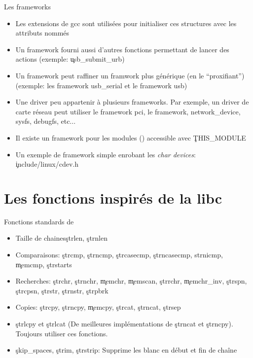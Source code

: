 \begin{frame}[fragile=singleslide]{Les frameworks}
  \begin{itemize} 
  \item  Les extensions  de gcc  sont utilisées  pour  initialiser ces
    structures avec les attributs nommés
  \item  Un framework  fourni aussi  d'autres fonctions  permettant de
    lancer des actions (exemple: \c{usb_submit_urb})
  \item Un  framework peut raffiner  un framwork plus générique  (en le
    ``proxifiant'')   (exemple:  les   framework  usb\_serial   et  le
    framework usb)
  \item Une driver peu appartenir à plusieurs frameworks. Par exemple,
    un  driver de  carte réseau  peut  utiliser le  framework pci,  le
    framework, network\_device, sysfs, debugfs, etc...
  \item    Il     existe    un    framework     pour    les    modules
    () accessible avec \c{THIS_MODULE}
  \item  Un  exemple  de   framework  simple  enrobant  les  \emph{char
      devices}: \c{include/linux/cdev.h}
  \end{itemize}
\end{frame} 

\section{Les fonctions inspirés de la libc}

\begin{frame}{Fonctions standards de }
  \begin{itemize} 
  \item Taille de chaines\c{strlen}, \c{strnlen}
  \item   Comparaisons:   \c{strcmp},   \c{strncmp},   \c{strcasecmp},
    \c{strncasecmp}, \c{ strnicmp}, \c{memcmp}, \c{strstarts}
  \item Recherches:  \c{strchr}, \c{strnchr}, \c{memchr}, \c{memscan},
    \c{strrchr},  \c{memchr_inv}, \c{strspn},  \c{strcpsn}, \c{strstr},
    \c{strnstr}, \c{strpbrk}
  \item  Copies:   \c{strcpy},  \c{strncpy},  \c{memcpy},  \c{strcat},
    \c{strncat}, \c{strsep}
  \item \c{strlcpy}  et \c{strlcat} (De  meilleures implémentations de
    \c{strncat} et \c{strncpy}). Toujours utiliser ces fonctions.
  \item \c{skip_spaces},  \c{strim}, \c{strstrip}: Supprime  les blanc
    en début et fin de chaîne
  \end{itemize}
\end{frame}

